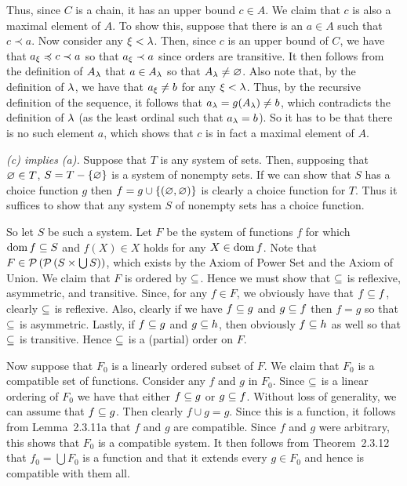 \begin{questions}
{{      Thus, since $C$ is a chain, it has an upper bound $c \in A$.
      We claim that $c$ is also a maximal element of $A$.
      To show this, suppose that there is an $a \in A$ such that $c \prec a$.
      Now consider any $\x < \l$.
      Then, since $c$ is an upper bound of $C$, we have that $a_\x \prece c \prec a$ so that $a_\x \prec a$ since orders are transitive.
      It then follows from the definition of $A_\l$ that $a \in A_\l$ so that $A_\l \neq \es$.
      Also note that, by the definition of $\l$, we have that $a_\x \neq b$ for any $\x < \l$.
      Thus, by the recursive definition of the sequence, it follows that $a_\l = g(A_\l) \neq b$, which contradicts the definition of $\l$ (as the least ordinal such that $a_\l = b$).
      So it has to be that there is no such element $a$, which shows that $c$ is in fact a maximal element of $A$.

      \emph{(c) implies (a).}
      Suppose that $T$ is any system of sets.
      Then, supposing that $\es \in T$, $S = T - \braces{\es}$ is a system of nonempty sets.
      If we can show that $S$ has a choice function $g$ then $f = g \cup \braces{(\es, \es)}$ is clearly a choice function for $T$.
      Thus it suffices to show that any system $S$ of nonempty sets has a choice function.

      So let $S$ be such a system.
      Let $F$ be the system of functions $f$ for which $\dom{f} \ss S$ and $f(X) \in X$ holds for any $X \in \dom{f}$.
      Note that $F \in \pset{\pset{S \times \bigcup S}}$, which exists by the Axiom of Power Set and the Axiom of Union.
      We claim that $F$ is ordered by $\ss$.
      Hence we must show that $\ss$ is reflexive, asymmetric, and transitive.
      Since, for any $f \in F$, we obviously have that $f \ss f$, clearly $\ss$ is reflexive.
      Also, clearly if we have $f \ss g$ and $g \ss f$ then $f=g$ so that $\ss$ is asymmetric.
      Lastly, if $f \ss g$ and $g \ss h$, then obviously $f \ss h$ as well so that $\ss$ is transitive.
      Hence $\ss$ is a (partial) order on $F$.

      Now suppose that $F_0$ is a linearly ordered subset of $F$.
      We claim that $F_0$ is a compatible set of functions.
      Consider any $f$ and $g$ in $F_0$.
      Since $\ss$ is a linear ordering of $F_0$ we have that either $f \ss g$ or $g \ss f$.
      Without loss of generality, we can assume that $f \ss g$.
      Then clearly $f \cup g = g$.
      Since this is a function, it follows from Lemma~2.3.11a that $f$ and $g$ are compatible.
      Since $f$ and $g$ were arbitrary, this shows that $F_0$ is a compatible system.
      It then follows from Theorem~2.3.12 that $f_0 = \bigcup F_0$ is a function and that it extends every $g \in F_0$ and hence is compatible with them all.

}}
\end{questions}
